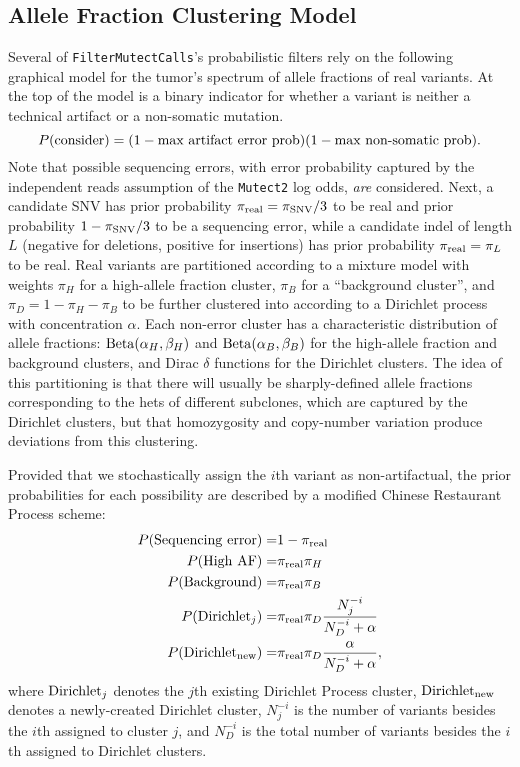 \documentclass[nofootinbib,amssymb,amsmath]{revtex4}
\newcommand{\code}[1]{\texttt{#1}}
\begin{document}
\subsection{Allele Fraction Clustering Model}
Several of \code{FilterMutectCalls}'s probabilistic filters rely on the following graphical model for the tumor's spectrum of allele fractions of real variants.  At the top of the model is a binary indicator for whether a variant is neither a technical artifact or a non-somatic mutation.
\begin{equation}
P({\rm consider}) = (1 - \textrm{max artifact error prob})(1 - \textrm{max non-somatic prob}).
\end{equation}
Note that possible sequencing errors, with error probability captured by the independent reads assumption of the \code{Mutect2} log odds, \textit{are} considered.  Next, a candidate SNV has prior probability $\pi_{\rm real} = \pi_{\rm SNV} / 3$ to be real and prior probability $1 - \pi_{\rm SNV}/3$ to be a sequencing error, while a candidate indel of length $L$ (negative for deletions, positive for insertions) has prior probability $\pi_{\rm real} = \pi_L$ to be real.  Real variants are partitioned according to a mixture model with weights $\pi_{H}$ for a high-allele fraction cluster, $\pi_B$ for a ``background cluster'', and $\pi_{D} = 1 - \pi_H - \pi_B$ to be further clustered into according to a Dirichlet process with concentration $\alpha$.  Each non-error cluster has a characteristic distribution of allele fractions:  ${\rm Beta}(\alpha_H, \beta_H)$ and ${\rm Beta}(\alpha_B, \beta_B)$ for the high-allele fraction and background clusters, and Dirac $\delta$ functions for the Dirichlet clusters.  The idea of this partitioning is that there will usually be sharply-defined allele fractions corresponding to the hets of different subclones, which are captured by the Dirichlet clusters, but that homozygosity and copy-number variation produce deviations from this clustering.

Provided that we stochastically assign the $i$th variant as non-artifactual, the prior probabilities for each possibility are described by a modified Chinese Restaurant Process scheme:
\begin{align}
P({\rm Sequencing~error}) =& 1 - \pi_{\rm real} \\
P({\rm High~AF}) =& \pi_{\rm real} \pi_H \\
P({\rm Background}) =& \pi_{\rm real} \pi_B \\
P({\rm Dirichlet}_j) =& \pi_{\rm real} \pi_D \frac{ N^{-i}_j}{N^{-i}_D + \alpha} \\
P({\rm Dirichlet}_{\rm new}) =& \pi_{\rm real} \pi_D \frac{ \alpha}{N^{-i}_D + \alpha},
\end{align}
where ${\rm Dirichlet}_j$ denotes the $j$th existing Dirichlet Process cluster, ${\rm Dirichlet}_{\rm new}$ denotes a newly-created Dirichlet cluster, $N^{-i}_j$ is the number of variants besides the $i$th assigned to cluster $j$, and $N^{-i}_D$ is the total number of variants besides the $i$th assigned to Dirichlet clusters.
\end{document}
